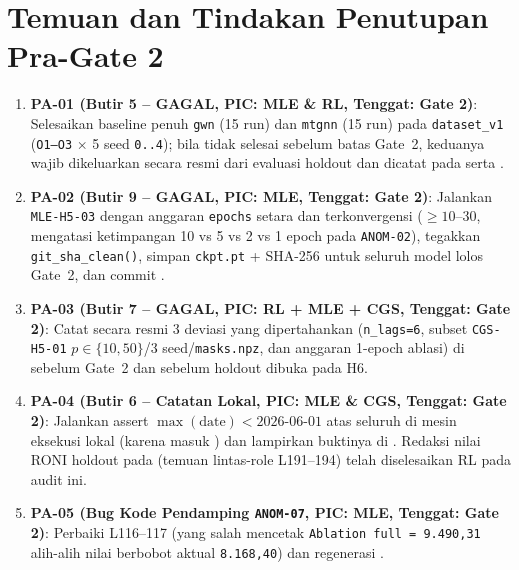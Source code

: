 \documentclass[11pt,a4paper]{article}
\begin{document}
\section{Temuan dan Tindakan Penutupan Pra-Gate 2}
\begin{enumerate}
  \item \textbf{PA-01 (Butir 5 -- GAGAL, PIC: MLE \& RL, Tenggat: Gate 2)}: Selesaikan baseline penuh
        \texttt{gwn} (15 run) dan \texttt{mtgnn} (15 run) pada \texttt{dataset\_v1} (\texttt{O1--O3} $\times$ 5 seed \texttt{0..4}); bila tidak selesai sebelum batas Gate~2, keduanya wajib dikeluarkan secara resmi dari evaluasi holdout dan dicatat pada  serta .
  \item \textbf{PA-02 (Butir 9 -- GAGAL, PIC: MLE, Tenggat: Gate 2)}: Jalankan \texttt{MLE-H5-03}
        dengan anggaran \texttt{epochs} setara dan terkonvergensi ($\ge 10$--$30$, mengatasi ketimpangan 10 vs 5 vs 2 vs 1 epoch pada \texttt{ANOM-02}), tegakkan \texttt{git\_sha\_clean()}, simpan \texttt{ckpt.pt} + SHA-256 untuk seluruh model lolos Gate~2, dan commit .
  \item \textbf{PA-03 (Butir 7 -- GAGAL, PIC: RL + MLE + CGS, Tenggat: Gate 2)}: Catat secara
        resmi 3 deviasi yang dipertahankan (\texttt{n\_lags=6}, subset \texttt{CGS-H5-01} $p\in\{10,50\}$/3 seed/\texttt{masks.npz}, dan anggaran 1-epoch ablasi) di  sebelum Gate~2 dan sebelum holdout dibuka pada H6.
  \item \textbf{PA-04 (Butir 6 -- Catatan Lokal, PIC: MLE \& CGS, Tenggat: Gate 2)}: Jalankan
        assert $\max(\text{date}) < 2026\text{-}06\text{-}01$ atas seluruh  di mesin eksekusi lokal (karena  masuk ) dan lampirkan buktinya di . Redaksi nilai RONI holdout pada  (temuan lintas-role  L191--194) telah diselesaikan RL pada audit ini.
  \item \textbf{PA-05 (Bug Kode Pendamping \texttt{ANOM-07}, PIC: MLE, Tenggat: Gate 2)}: Perbaiki
         L116--117 (yang salah mencetak \texttt{Ablation full = 9.490,31} alih-alih nilai berbobot aktual \texttt{8.168,40}) dan regenerasi .
\end{enumerate}
\end{document}
